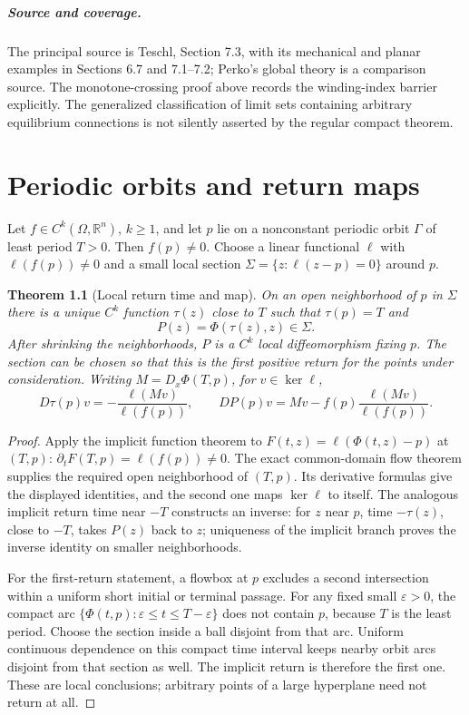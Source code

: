 \documentclass[11pt,oneside]{book}
\newtheorem{theorem}{Theorem}[chapter]
\theoremstyle{definition}
\theoremstyle{remark}\newtheorem{remark}[theorem]{Remark}
\newcommand{\R}{\mathbb R}\newcommand{\C}{\mathbb C}
\begin{document}
\paragraph{Source and coverage.}
The principal source is Teschl, Section 7.3, with its mechanical and
planar examples in Sections 6.7 and 7.1--7.2; Perko's global theory is
a comparison source. The monotone-crossing proof above records the
winding-index barrier explicitly. The generalized classification of
limit sets containing arbitrary equilibrium connections is not
silently asserted by the regular compact theorem.



\chapter{Periodic orbits and return maps}\label{ch:d13-14}

Let \(f\in C^k(\Omega,\R^n)\), \(k\ge1\), and let
\(p\) lie on a nonconstant periodic orbit \(\Gamma\) of least period \(T>0\).
Then \(f(p)\ne0\). Choose a linear functional \(\ell\) with
\(\ell(f(p))\ne0\) and a small local section
\(\Sigma=\{z:\ell(z-p)=0\}\) around \(p\).

\begin{theorem}[Local return time and map]\label{d13:14:return-map}
On an open neighborhood of \(p\) in \(\Sigma\) there is a unique \(C^k\)
function \(\tau(z)\) close to \(T\) such that
\(\tau(p)=T\) and
\[
 P(z)=\Phi(\tau(z),z)\in\Sigma .
\]
After shrinking the neighborhoods, \(P\) is a \(C^k\) local
diffeomorphism fixing \(p\). The section can be chosen so that this is
the first positive return for the points under consideration.
Writing \(M=D_x\Phi(T,p)\), for \(v\in\ker\ell\),
\[
 D\tau(p)v=-\frac{\ell(Mv)}{\ell(f(p))},\qquad
 DP(p)v=Mv-f(p)\frac{\ell(Mv)}{\ell(f(p))}.
\]
\end{theorem}
\begin{proof}
Apply the implicit function theorem to
\(F(t,z)=\ell(\Phi(t,z)-p)\) at \((T,p)\):
\(\partial_tF(T,p)=\ell(f(p))\ne0\).
The exact common-domain flow theorem supplies the required open
neighborhood of \((T,p)\). Its derivative formulas give the displayed
identities, and the second one maps \(\ker\ell\) to itself.
The analogous implicit return time near \(-T\) constructs an inverse:
for \(z\) near \(p\), time \(-\tau(z)\), close to \(-T\), takes
\(P(z)\) back to \(z\); uniqueness of the implicit branch proves
the inverse identity on smaller neighborhoods.

For the first-return statement, a flowbox at \(p\) excludes a second
intersection within a uniform short initial or terminal passage.
For any fixed small \(\varepsilon>0\), the compact arc
\(\{\Phi(t,p):\varepsilon\le t\le T-\varepsilon\}\) does not contain
\(p\), because \(T\) is the least period. Choose the section inside a
ball disjoint from that arc. Uniform continuous dependence on this
compact time interval keeps nearby orbit arcs disjoint from that
section as well. The implicit return is therefore the first one.
These are local conclusions; arbitrary points of a large hyperplane
need not return at all.
\end{proof}
\end{document}
